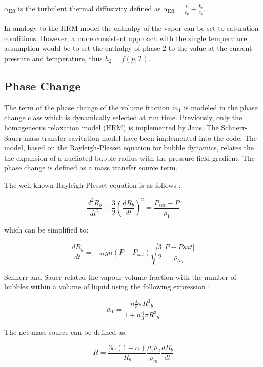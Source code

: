 \documentclass{article}
\begin{document}
$\alpha_\mathrm{Eff}$ is the turbulent thermal diffusivity defined as  $\alpha_\mathrm{Eff}= \frac{k}{c_p} + \frac{k_t}{c_p}$.

In analogy to the HRM model the enthalpy of the vapor can be set to saturation conditions. However, a more consistent approach with the single temperature assumption would be to set the enthalpy of phase 2 to the value at the current pressure and temperature, thus $h_2 = f(p,T)$.

\subsection{Phase Change}
The term of the phase change of the volume fraction $\dot{m}_1$ is modeled in the phase change class which is dynamically selected at run time. Previously, only the homogeneous relaxation model (HRM) is implemented by Jans. The Schnerr-Sauer mass transfer cavitation model have been implemented into the code. The model, based on the Rayleigh-Plesset equation for bubble dynamics, relates the the expansion of a nucliated bubble radius with the pressure field gradient. The phase change is defined as a mass transfer source term.

The well known Rayleigh-Plesset equation is as follows \cite{ples77}:

\begin{equation}
	\frac{d^2R_b}{dt^2} + \frac{3}{2}\left(\frac{dR_b}{dt}\right)^2 = \frac{P_{sat}-P}{\rho_1}
\end{equation}

which can be simplified to:

\begin{equation}
	\frac{dR_b}{dt} = -sign(P - P_{sat})\sqrt{\frac{3}{2}\frac{|P-P{sat}|}{\rho_{liq}}}
\end{equation}

Schnerr and Sauer related the vapour volume fraction with the number of bubbles within a volume of liquid using the following expression \cite{saue00}:

\begin{equation}
	\alpha_1 = \frac{n\frac{4}{3}\pi{R^3}_b}{1 + n\frac{4}{3}\pi{R^3}_b}
\end{equation}

The net mass source can be defined as:

\begin{equation}
	R = \frac{3\alpha(1-\alpha)}{R_b}\frac{\rho_1\rho_2}{\rho_m}\frac{dR_b}{dt}
\end{equation}
\end{document}
